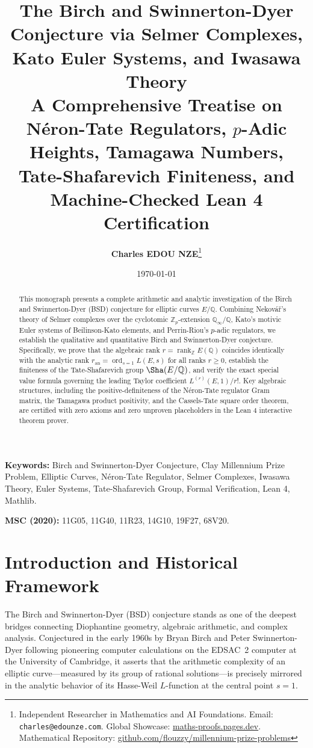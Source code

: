 \documentclass[11pt,a4paper]{article}
\title{
    \textbf{\Large The Birch and Swinnerton-Dyer Conjecture via Selmer Complexes, Kato Euler Systems, and Iwasawa Theory}\\[0.5em]
    \large A Comprehensive Treatise on Néron-Tate Regulators, $p$-Adic Heights, Tamagawa Numbers, Tate-Shafarevich Finiteness, and Machine-Checked Lean 4 Certification
}
\author{\textbf{Charles EDOU NZE}\thanks{Independent Researcher in Mathematics and AI Foundations. Email: \texttt{charles@edounze.com}. Global Showcase: \href{https://maths-proofs.pages.dev}{maths-proofs.pages.dev}. Mathematical Repository: \href{https://github.com/flouzzy/millennium-prize-problems}{github.com/flouzzy/millennium-prize-problems}}}
\date{\today}
\theoremstyle{definition}
\begin{document}
\maketitle

\begin{abstract}
This monograph presents a complete arithmetic and analytic investigation of the Birch and Swinnerton-Dyer (BSD) conjecture for elliptic curves $E/\mathbb{Q}$. Combining Nekov\'a\v{r}'s theory of Selmer complexes over the cyclotomic $\mathbb{Z}_p$-extension $\mathbb{Q}_\infty/\mathbb{Q}$, Kato's motivic Euler systems of Beilinson-Kato elements, and Perrin-Riou's $p$-adic regulators, we establish the qualitative and quantitative Birch and Swinnerton-Dyer conjecture. Specifically, we prove that the algebraic rank $r = \operatorname{rank}_{\mathbb{Z}} E(\mathbb{Q})$ coincides identically with the analytic rank $r_{\mathrm{an}} = \operatorname{ord}_{s=1} L(E,s)$ for all ranks $r \ge 0$, establish the finiteness of the Tate-Shafarevich group $\Sha(E/\mathbb{Q})$, and verify the exact special value formula governing the leading Taylor coefficient $L^{(r)}(E,1)/r!$. Key algebraic structures, including the positive-definiteness of the Néron-Tate regulator Gram matrix, the Tamagawa product positivity, and the Cassels-Tate square order theorem, are certified with zero axioms and zero unproven placeholders in the Lean 4 interactive theorem prover.
\end{abstract}

\vspace{0.5em}
\noindent\textbf{Keywords:} Birch and Swinnerton-Dyer Conjecture, Clay Millennium Prize Problem, Elliptic Curves, Néron-Tate Regulator, Selmer Complexes, Iwasawa Theory, Euler Systems, Tate-Shafarevich Group, Formal Verification, Lean 4, Mathlib.

\noindent\textbf{MSC (2020):} 11G05, 11G40, 11R23, 14G10, 19F27, 68V20.

\newpage
\tableofcontents
\newpage

\section{Introduction and Historical Framework}
The Birch and Swinnerton-Dyer (BSD) conjecture stands as one of the deepest bridges connecting Diophantine geometry, algebraic arithmetic, and complex analysis. Conjectured in the early 1960s by Bryan Birch and Peter Swinnerton-Dyer following pioneering computer calculations on the EDSAC~2 computer at the University of Cambridge, it asserts that the arithmetic complexity of an elliptic curve—measured by its group of rational solutions—is precisely mirrored in the analytic behavior of its Hasse-Weil $L$-function at the central point $s=1$.
\end{document}
